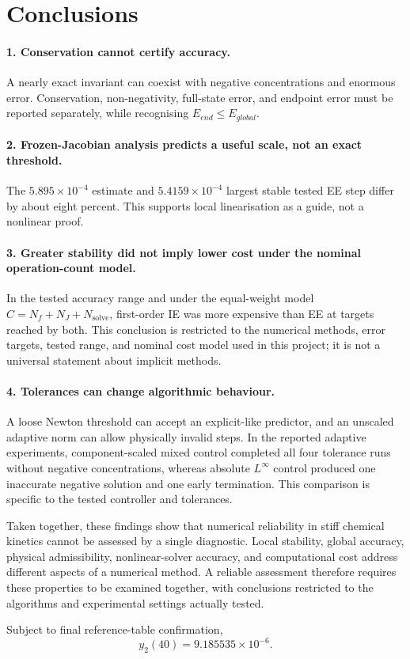 \section{Conclusions}
\paragraph{1. Conservation cannot certify accuracy.} A nearly exact invariant can coexist with negative concentrations and enormous error. Conservation, non-negativity, full-state error, and endpoint error must be reported separately, while recognising $E_{end}\le E_{global}$.

\paragraph{2. Frozen-Jacobian analysis predicts a useful scale, not an exact threshold.} The $5.895\times10^{-4}$ estimate and $5.4159\times10^{-4}$ largest stable tested EE step differ by about eight percent. This supports local linearisation as a guide, not a nonlinear proof.

\paragraph{3. Greater stability did not imply lower cost under the nominal operation-count model.} In the tested accuracy range and under the equal-weight model $C=N_f+N_J+N_{\mathrm{solve}}$, first-order IE was more expensive than EE at targets reached by both. This conclusion is restricted to the numerical methods, error targets, tested range, and nominal cost model used in this project; it is not a universal statement about implicit methods.

\paragraph{4. Tolerances can change algorithmic behaviour.} A loose Newton threshold can accept an explicit-like predictor, and an unscaled adaptive norm can allow physically invalid steps. In the reported adaptive experiments, component-scaled mixed control completed all four tolerance runs without negative concentrations, whereas absolute $L^\infty$ control produced one inaccurate negative solution and one early termination. This comparison is specific to the tested controller and tolerances.

Taken together, these findings show that numerical reliability in stiff chemical kinetics cannot be assessed by a single diagnostic. Local stability, global accuracy, physical admissibility, nonlinear-solver accuracy, and computational cost address different aspects of a numerical method. A reliable assessment therefore requires these properties to be examined together, with conclusions restricted to the algorithms and experimental settings actually tested.

Subject to final reference-table confirmation,
\[
\boxed{y_2(40)=9.185535\times10^{-6}}.
\]
